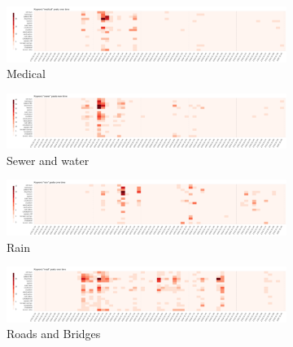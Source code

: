 \begin{figure}[!h]
    \centering
    \begin{subfigure}[!h]{0.92\textwidth}
        \centering
        \includegraphics[width=1.00\textwidth]{figs/q2/medical_2_3_heat.png}
        \caption{Medical}
        \label{fig:medical_2_3_heat}
    \end{subfigure}
    \begin{subfigure}[!h]{0.92\textwidth}
        \centering
        \includegraphics[width=1.00\textwidth]{figs/q2/sewer_2_3_heat.png}
        \caption{Sewer and water}
        \label{fig:sewer_2_3_heat}
    \end{subfigure}
    \begin{subfigure}[!h]{0.92\textwidth}
        \centering
        \includegraphics[width=1.00\textwidth]{figs/q2/rain_2_3_heat.png}
        \caption{Rain}
        \label{fig:rain_2_3_heat}
    \end{subfigure}
    \begin{subfigure}[!h]{0.92\textwidth}
        \centering
        \includegraphics[width=1.00\textwidth]{figs/q2/road_2_3_heat.png}
        \caption{Roads and Bridges}
        \label{fig:roads_2_3_heat}
    \end{subfigure}
    \begin{subfigure}[!h]{0.92\textwidth}
        \centering

\end{subfigure}
\end{figure}
